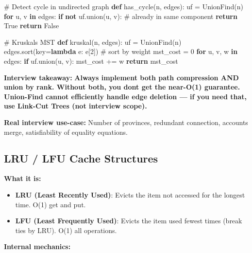 \documentclass[11pt]{article}
\providecommand{\tightlist}{\setlength{\itemsep}{1pt}\setlength{\parskip}{0pt}}
\newenvironment{Shaded}{\begin{snugshade}}{\end{snugshade}}
\newcommand{\CommentTok}[1]{\textcolor[rgb]{0.48,0.49,0.49}{#1}}
\newcommand{\ControlFlowTok}[1]{\textcolor[rgb]{0.99,0.74,0.29}{\textbf{#1}}}
\newcommand{\DecValTok}[1]{\textcolor[rgb]{0.96,0.45,0.00}{#1}}
\newcommand{\KeywordTok}[1]{\textcolor[rgb]{0.81,0.81,0.76}{\textbf{#1}}}
\newcommand{\NormalTok}[1]{\textcolor[rgb]{0.81,0.81,0.76}{#1}}
\newcommand{\OperatorTok}[1]{\textcolor[rgb]{0.81,0.81,0.76}{#1}}
\newcommand{\VariableTok}[1]{\textcolor[rgb]{0.15,0.68,0.68}{#1}}
\begin{document}
\begin{Shaded}
\begin{Highlighting}[]
\CommentTok{\# Detect cycle in undirected graph}
\KeywordTok{def}\NormalTok{ has\_cycle(n, edges):}
\NormalTok{    uf }\OperatorTok{=}\NormalTok{ UnionFind(n)}
    \ControlFlowTok{for}\NormalTok{ u, v }\KeywordTok{in}\NormalTok{ edges:}
        \ControlFlowTok{if} \KeywordTok{not}\NormalTok{ uf.union(u, v):  }\CommentTok{\# already in same component}
            \ControlFlowTok{return} \VariableTok{True}
    \ControlFlowTok{return} \VariableTok{False}

\CommentTok{\# Kruskal\textquotesingle{}s MST}
\KeywordTok{def}\NormalTok{ kruskal(n, edges):}
\NormalTok{    uf }\OperatorTok{=}\NormalTok{ UnionFind(n)}
\NormalTok{    edges.sort(key}\OperatorTok{=}\KeywordTok{lambda}\NormalTok{ e: e[}\DecValTok{2}\NormalTok{])  }\CommentTok{\# sort by weight}
\NormalTok{    mst\_cost }\OperatorTok{=} \DecValTok{0}
    \ControlFlowTok{for}\NormalTok{ u, v, w }\KeywordTok{in}\NormalTok{ edges:}
        \ControlFlowTok{if}\NormalTok{ uf.union(u, v):}
\NormalTok{            mst\_cost }\OperatorTok{+=}\NormalTok{ w}
    \ControlFlowTok{return}\NormalTok{ mst\_cost}
\end{Highlighting}
\end{Shaded}

\textbf{Interview takeaway:} \textbf{Always implement both path compression AND union by rank. Without both, you don\textquotesingle t get the near-O(1) guarantee. Union-Find cannot efficiently handle edge deletion --- if you need that, use Link-Cut Trees (not interview scope).}

\textbf{Real interview use-case:} Number of provinces, redundant connection, accounts merge, satisfiability of equality equations.

\subsection{LRU / LFU Cache Structures}\label{lru--lfu-cache-structures}

\textbf{What it is:}

\begin{itemize}
\tightlist
\item
  \textbf{LRU (Least Recently Used)}: Evicts the item not accessed for the longest time. O(1) get and put.
\item
  \textbf{LFU (Least Frequently Used)}: Evicts the item used fewest times (break ties by LRU). O(1) all operations.
\end{itemize}

\textbf{Internal mechanics:}
\end{document}

